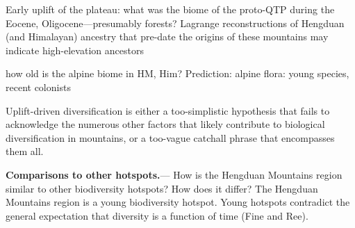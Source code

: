 


Early uplift of the plateau: what was the biome of the proto-QTP during the Eocene, Oligocene---presumably forests? Lagrange reconstructions of Hengduan (and Himalayan) ancestry that pre-date the origins of these mountains may indicate high-elevation ancestors

how old is the alpine biome in HM, Him? Prediction: alpine flora: young species, recent colonists

Uplift-driven diversification is either a too-simplistic hypothesis that fails to acknowledge the numerous other factors that likely contribute to biological diversification in mountains, or a too-vague catchall phrase that encompasses them all.


\textbf{Comparisons to other hotspots.}---%
How is the Hengduan Mountains region similar to other biodiversity hotspots? How does it differ? The Hengduan Mountains region is a young biodiversity hotspot. Young hotspots contradict the general expectation that diversity is a function of time (Fine and Ree).

